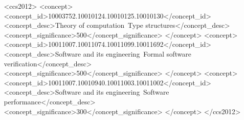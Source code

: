 \begin{CCSXML}
<ccs2012>
    <concept>
        <concept_id>10003752.10010124.10010125.10010130</concept_id>
        <concept_desc>Theory of computation~Type structures</concept_desc>
        <concept_significance>500</concept_significance>
    </concept>
    <concept>
        <concept_id>10011007.10011074.10011099.10011692</concept_id>
        <concept_desc>Software and its engineering~Formal software verification</concept_desc>
        <concept_significance>500</concept_significance>
    </concept>
    <concept>
        <concept_id>10011007.10010940.10011003.10011002</concept_id>
        <concept_desc>Software and its engineering~Software performance</concept_desc>
        <concept_significance>300</concept_significance>
        </concept>
  </ccs2012>
\end{CCSXML}


